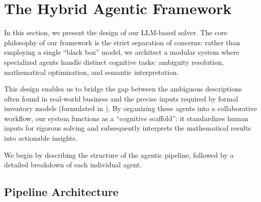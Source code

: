 \documentclass[mnsc,nonblindrev]{informs3_hide}
\begin{document}

    
    
    
\section{The Hybrid Agentic Framework}
\label{sec:framework}


In this section, we present the design of our LLM-based solver. The core philosophy of our framework is the strict separation of concerns: rather than employing a single ``black box'' model, we architect a modular system where specialized agents handle distinct cognitive tasks: ambiguity resolution, mathematical optimization, and semantic interpretation.

This design enables us to bridge the gap between the ambiguous descriptions often found in real-world business and the precise inputs required by formal inventory models (formulated in ). By organizing these agents into a collaborative workflow, our system functions as a ``cognitive scaffold'': it standardizes human inputs for rigorous solving and subsequently interprets the mathematical results into actionable insights.

We begin by describing the structure of the agentic pipeline, followed by a detailed breakdown of each individual agent.


\vspace{-.5em}

\subsection{Pipeline Architecture}
\end{document}
